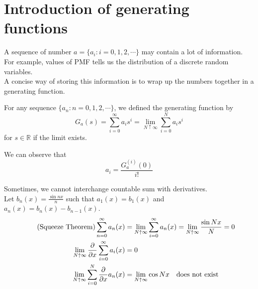 \documentclass{huhtakm-template-book}
\begin{document}
\section{Introduction of generating functions}
A sequence of number $a=\{a_{i}:i=0,1,2,\cdots\}$ may contain a lot of information. For example, values of PMF tells us the distribution of a discrete random variables.\\
A concise way of storing this information is to wrap up the numbers together in a generating function. 
\begin{defn}
	For any sequence $\{a_{n}:n=0,1,2,\cdots\}$, we defined the generating function by
	\begin{equation*}
		G_{a}(s)=\sum_{i=0}^{\infty}a_{i}s^{i}=\lim_{N\uparrow\infty}\sum_{i=0}^{N}a_{i}s^{i}
	\end{equation*}
	for $s\in\mathbb{R}$ if the limit exists. 
\end{defn}
\begin{rem}
	We can observe that
	\begin{equation*}
		a_{i}=\frac{G_{a}^{(i)}(0)}{i!}
	\end{equation*}
\end{rem}
\begin{eg}
	Sometimes, we cannot interchange countable sum with derivatives.\\
	Let $b_{n}(x)=\frac{\sin{nx}}{n}$ such that $a_{1}(x)=b_{1}(x)$ and $a_{n}(x)=b_{n}(x)-b_{n-1}(x)$.
	\begin{align*}
		\tag{Squeeze Theorem}
		\sum_{n=0}^{\infty}a_{n}(x)&=\lim_{N\uparrow\infty}\sum_{i=0}^{\infty}a_{n}(x)=\lim_{N\uparrow\infty}\frac{\sin{Nx}}{N}=0\\
		\lim_{N\uparrow\infty}\pdv*{\sum_{i=0}^{\infty}a_{i}(x)}{x}&=0\\
		\lim_{N\uparrow\infty}\sum_{i=0}^{N}\pdv*{a_{n}(x)}{x}&=\lim_{N\uparrow\infty}\cos{Nx}\quad \text{does not exist}
	\end{align*}
\end{eg}
\end{document}
